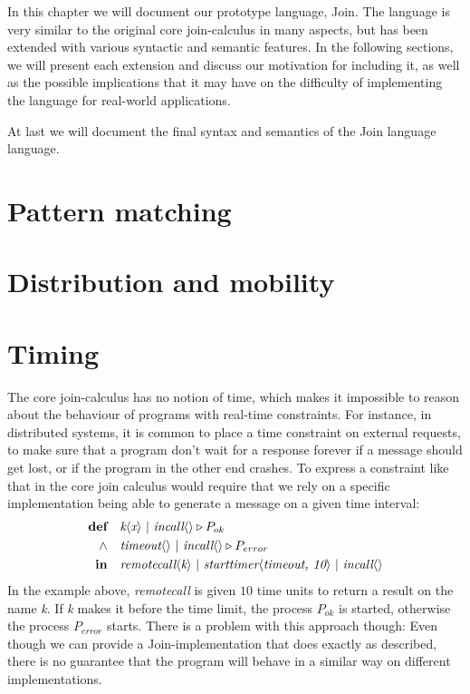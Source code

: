 In this chapter we will document our prototype language, Join.  The
language is very similar to the original core join-calculus in many
aspects, but has been extended with various syntactic and semantic
features. In the following sections, we will present each extension
and discuss our motivation for including it, as well as the possible
implications that it may have on the difficulty of implementing the
language for real-world applications.

At last we will document the final syntax and semantics of the Join
language language.


\section{Pattern matching}

\section{Distribution and mobility}

\section{Timing}

The core join-calculus has no notion of time, which makes it
impossible to reason about the behaviour of programs with real-time
constraints.  For instance, in distributed systems, it is common to
place a time constraint on external requests, to make sure that a
program don't wait for a response forever if a message should get
lost, or if the program in the other end crashes. To express a
constraint like that in the core join calculus would require that we
rely on a specific implementation being able to generate a message on
a given time interval:
\begin{align*}
  \textbf{def}\quad & \S k<x> ~|~ \S incall<> \triangleright P_{ok} \\
  \land\quad & \S timeout<> ~|~ \S incall<> \triangleright P_{error} \\
  \textbf{in}\quad & \S remotecall<k> ~|~ \S starttimer<timeout, 10>
                                      ~|~ \S incall<>
\end{align*}
In the example above, \emph{remotecall} is given $10$ time units to
return a result on the name \emph{k}. If \emph{k} makes it before the
time limit, the process $P_{ok}$ is started, otherwise the process
$P_{error}$ starts.  There is a problem with this approach though:
Even though we can provide a Join-implementation that does exactly as
described, there is no guarantee that the program will behave in a
similar way on different implementations.

